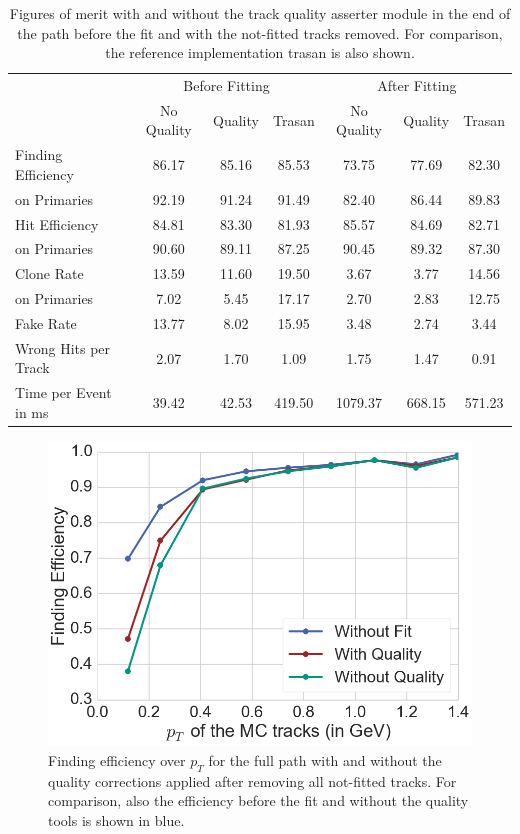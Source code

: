 \begin{table}
  \caption{Figures of merit with and without the track quality asserter module in the end of the path before the fit and with the not-fitted tracks removed. For comparison, the reference implementation trasan is also shown.}
  \centering
  \begin{tabular}{lcccccc} \toprule
    & \multicolumn{3}{c}{Before Fitting} & \multicolumn{3}{c}{After Fitting} \\ 
    & No Quality & Quality & Trasan & No Quality & Quality & Trasan \\ \midrule
    Finding Efficiency   & 86.17 & 85.16 & 85.53 & 73.75 & 77.69 & 82.30 \\
    \quad on Primaries   & 92.19 & 91.24 & 91.49 & 82.40 & 86.44 & 89.83 \\ 
    Hit Efficiency       & 84.81 & 83.30 & 81.93 & 85.57 & 84.69 & 82.71 \\
    \quad on Primaries   & 90.60 & 89.11 & 87.25 & 90.45 & 89.32 & 87.30 \\ 
    Clone Rate           & 13.59 & 11.60 & 19.50 & 3.67  & 3.77  & 14.56 \\
    \quad on Primaries   & 7.02  & 5.45  & 17.17 & 2.70  & 2.83  & 12.75 \\ 
    Fake Rate            & 13.77 & 8.02  & 15.95 & 3.48  & 2.74  & 3.44 \\ 
    Wrong Hits per Track & 2.07  & 1.70  & 1.09  & 1.75  & 1.47  & 0.91 \\
    Time per Event in ms & 39.42 & 42.53 & 419.50& 1079.37 & 668.15 & 571.23 \\ \bottomrule
  \end{tabular}  
  \label{tab-results-after-fitting}
\end{table}

\begin{figure}
  \centering
  \includegraphics[width=0.7\linewidth]{figures/workflow/efficiency_after_fit.png}
  \caption{Finding efficiency over $p_T$ for the full path with and without the quality corrections applied after removing all not-fitted tracks. For comparison, also the efficiency before the fit and without the quality tools is shown in blue.}
  \label{fig-efficiency-after-fitting}
\end{figure}

